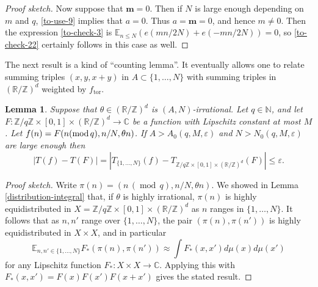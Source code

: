 \documentclass[10pt,reqno]{amsart}
\newtheorem{lemma}[theorem]{Lemma}
\theoremstyle{definition}
\theoremstyle{remark}
\newcommand{\md}[1]{\ensuremath{\,(\operatorname{mod}\, #1)}}
\newcommand{\mdlem}[1]{\ensuremath{(\mbox{\textup{mod}}\, #1)}}
\renewcommand{\leq}{\leqslant}
\newcommand\Lip{\operatorname{Lip}}
\newcommand\tor{\operatorname{tor}}
\def\R{\mathbb{R}}
\def\C{\mathbb{C}}
\def\Z{\mathbb{Z}}
\def\E{\mathbb{E}}
\def\N{\mathbb{N}}
\def\eps{\varepsilon}
\numberwithin{equation}{section}
\begin{document}
\begin{proof}[Proof sketch]
Now suppose that $\mathbf{m} = 0$. Then if $N$ is large enough depending on $m$ and $q$, \eqref{to-use-9} implies that $a = 0$. Thus $a = \mathbf{m} = 0$, and hence $m \neq 0$. Then the expression \eqref{to-check-3} is $\E_{n \leq N}\left(e(mn/2N) + e(-mn/2N)\right) = 0$, so \eqref{to-check-22} certainly follows in this case as well.
\end{proof}

%

The next result is a kind of ``counting lemma''. It eventually allows one to relate summing triples $(x, y, x+y)$ in $A \subset \{1,\dots,N\}$ with summing triples in $(\R/\Z)^d$ weighted by $f_{\tor}$.

\begin{lemma}\label{counting-lemma}
Suppose that $\theta \in (\R/\Z)^d$ is $(A, N)$-irrational. Let $q \in \N$, and let $F : \Z/q\Z \times [0,1] \times (\R/\Z)^d \to \C$ be a function with Lipschitz constant at most $M$. Let $f(n) = F(n \mdlem{q}, n/N, \theta n)$. If $A > A_0(q,M,\eps)$ and $N>N_0(q,M,\eps)$ are large enough then 
\[ |T(f) - T(F)| = |T_{\{1,\dots, N\}}(f) - T_{\Z/q\Z \times [0,1] \times (\R/\Z)^d}(F)| \leq \eps.\]
\end{lemma}
\begin{proof}[Proof sketch] Write $\pi(n) = (n \md{q}, n/N, \theta n)$. We showed in Lemma \ref{distribution-integral} that, if $\theta$ is highly irrational, $\pi(n)$ is highly equidistributed in $X = \Z/q\Z \times [0,1] \times (\R/\Z)^d$ as $n$ ranges in $\{1,\dots,N\}$. It follows that as $n,n'$ range over $\{1,\dots,N\}$, the pair $(\pi(n), \pi(n'))$ is highly equidistributed in $X \times X$, and in particular \[\E_{n, n' \in \{1,\dots, N\}} F_*(\pi(n), \pi(n')) \approx \int F_*(x,x') d\mu(x) d\mu(x')\] for any Lipschitz function $F_* : X \times X \rightarrow \C$. Applying this with $F_*(x,x') = F(x) F(x') F(x + x')$ gives the stated result. 
\end{proof}
\end{document}
